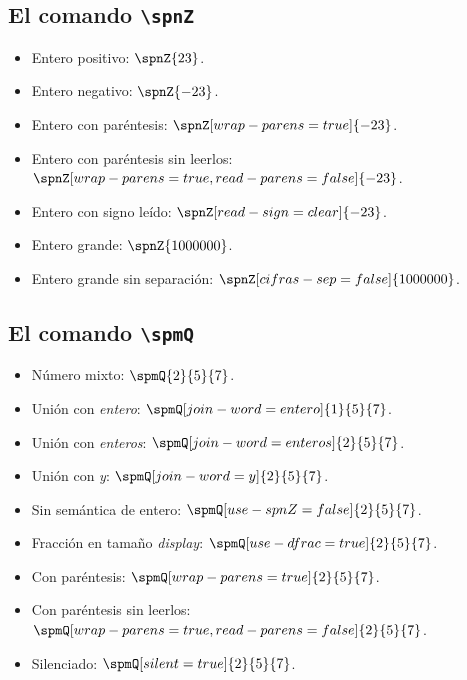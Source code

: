 \documentclass{article}
\begin{document}
\subsection*{El comando \texttt{\textbackslash spnZ}}

\begin{itemize}
  \item Entero positivo: $\spnZ{23}$.
  \item Entero negativo: $\spnZ{-23}$.
  \item Entero con paréntesis: $\spnZ[wrap-parens=true]{-23}$.
  \item Entero con paréntesis sin leerlos: $\spnZ[wrap-parens=true,read-parens=false]{-23}$.
  \item Entero con signo leído: $\spnZ[read-sign=clear]{-23}$.
  \item Entero grande: $\spnZ{1000000}$.
  \item Entero grande sin separación: $\spnZ[cifras-sep=false]{1000000}$.
\end{itemize}

\subsection*{El comando \texttt{\textbackslash spmQ}}

\begin{itemize}
  \item Número mixto: $\spmQ{2}{5}{7}$.
  \item Unión con \emph{entero}: $\spmQ[join-word=entero]{1}{5}{7}$.
  \item Unión con \emph{enteros}: $\spmQ[join-word=enteros]{2}{5}{7}$.
  \item Unión con \emph{y}: $\spmQ[join-word=y]{2}{5}{7}$.
  \item Sin semántica de entero: $\spmQ[use-spnZ=false]{2}{5}{7}$.
  \item Fracción en tamaño \emph{display}: $\spmQ[use-dfrac=true]{2}{5}{7}$.
  \item Con paréntesis: $\spmQ[wrap-parens=true]{2}{5}{7}$.
  \item Con paréntesis sin leerlos: $\spmQ[wrap-parens=true,read-parens=false]{2}{5}{7}$.
  \item Silenciado: $\spmQ[silent=true]{2}{5}{7}$.
\end{itemize}
\end{document}
